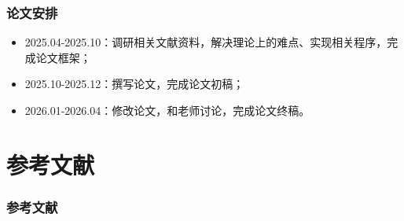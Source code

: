 \documentclass{beamer}  %
\numberwithin{subsection}{section}             %
\begin{document}
\begin{frame}
\frametitle{论文安排}
\small{
\begin{itemize}
	\item 2025.04-2025.10：调研相关文献资料，解决理论上的难点、实现相关程序，完成论文框架；
	
	\item 2025.10-2025.12：撰写论文，完成论文初稿；
	
	\item 2026.01-2026.04：修改论文，和老师讨论，完成论文终稿。
\end{itemize}
}
\end{frame}

\section*{参考文献}
\begin{frame}[allowframebreaks]
\frametitle{参考文献}
\tiny


\end{frame}


%
%
\end{document}
